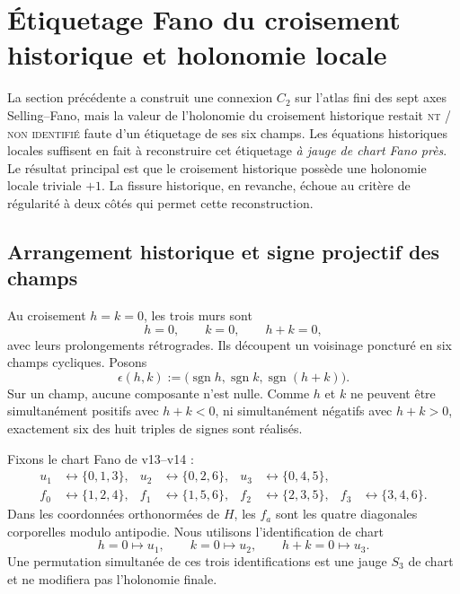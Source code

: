 \documentclass[11pt,a4paper]{article}
\newcommand{\statusNT}{\textsc{nt / non identifié}}
\begin{document}
\section{Étiquetage Fano du croisement historique et holonomie locale}\label{sec:v15-historical-fano-holonomy}

La section précédente a construit une connexion $C_2$ sur l'atlas fini des sept axes Selling--Fano, mais la valeur de l'holonomie du croisement historique restait \statusNT{} faute d'un étiquetage de ses six champs. Les équations historiques locales suffisent en fait à reconstruire cet étiquetage \emph{à jauge de chart Fano près}. Le résultat principal est que le croisement historique possède une holonomie locale triviale $+1$. La fissure historique, en revanche, échoue au critère de régularité à deux côtés qui permet cette reconstruction.

\subsection{Arrangement historique et signe projectif des champs}

Au croisement $h=k=0$, les trois murs sont
\begin{equation}\label{eq:v15-historical-walls}
 \boxed{h=0,\qquad k=0,\qquad h+k=0,}
\end{equation}
avec leurs prolongements rétrogrades. Ils découpent un voisinage poncturé en six champs cycliques. Posons
\begin{equation}\label{eq:v15-sign-triple}
 \epsilon(h,k)
 :=
 \bigl(\operatorname{sgn}h,
       \operatorname{sgn}k,
       \operatorname{sgn}(h+k)\bigr).
\end{equation}
Sur un champ, aucune composante n'est nulle. Comme $h$ et $k$ ne peuvent être simultanément positifs avec $h+k<0$, ni simultanément négatifs avec $h+k>0$, exactement six des huit triples de signes sont réalisés.

Fixons le chart Fano de v13--v14 :
\[
 \begin{aligned}
 u_1&\leftrightarrow \{0,1,3\},&
 u_2&\leftrightarrow \{0,2,6\},&
 u_3&\leftrightarrow \{0,4,5\},\\
 f_0&\leftrightarrow \{1,2,4\},&
 f_1&\leftrightarrow \{1,5,6\},&
 f_2&\leftrightarrow \{2,3,5\},&
 f_3&\leftrightarrow \{3,4,6\}.
 \end{aligned}
\]
Dans les coordonnées orthonormées de $H$, les $f_a$ sont les quatre diagonales corporelles modulo antipodie. Nous utilisons l'identification de chart
\begin{equation}\label{eq:v15-wall-chart}
 h=0\mapsto u_1,
 \qquad
 k=0\mapsto u_2,
 \qquad
 h+k=0\mapsto u_3.
\end{equation}
Une permutation simultanée de ces trois identifications est une jauge $S_3$ de chart et ne modifiera pas l'holonomie finale.
\end{document}
